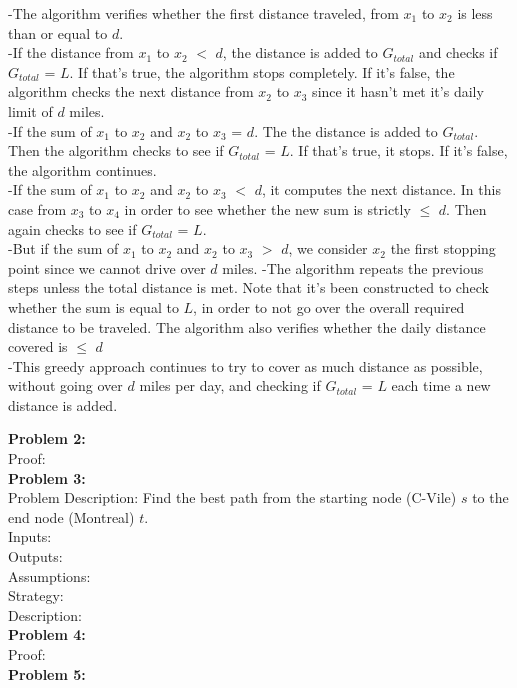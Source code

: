 \documentclass{article}
\begin{document}
\begin{addmargin}[1em]{2em}%
-The algorithm verifies whether the first distance traveled, from \(x_1\) to \(x_2\) is less than or equal to \(d\).\\
-If the distance from \(x_1\) to \(x_2\) $<$ \(d\), the distance is added to \(G_{total}\) and checks if \(G_{total}\) = \(L\). If that's true, the algorithm stops completely. If it's false, the algorithm checks the next distance from \(x_2\) to \(x_3\) since it hasn't met it's daily limit of \(d\) miles.\\
-If the sum of \(x_1\) to \(x_2\) and \(x_2\) to \(x_3\) = \(d\). The the distance is added to \(G_{total}\). Then the algorithm checks to see if \(G_{total}\) = \(L\). If that's true, it stops. If it's false, the algorithm continues.\\
-If the sum of \(x_1\) to \(x_2\) and \(x_2\) to \(x_3\) $<$ \(d\), it computes the next distance. In this case from \(x_3\) to \(x_4\) in order to see whether the new sum is strictly $\leq$ \(d\). Then again checks to see if \(G_{total}\) = \(L\). \\
-But if the sum of \(x_1\) to \(x_2\) and \(x_2\) to \(x_3\) $>$ \(d\), we consider \(x_2\) the first stopping point since we cannot drive over \(d\) miles.
-The algorithm repeats the previous steps unless the total distance is met. Note that it's been constructed to check whether the sum is equal to \(L\), in order to not go over the overall required distance to be traveled. The algorithm also verifies whether the daily distance covered is $\leq$ \(d\)\\
-This greedy approach continues to try to cover as much distance as possible, without going over \(d\) miles per day, and checking if \(G_{total}\) = \(L\) each time a new distance is added.\\
\end{addmargin}

\textbf{Problem 2:}\\
Proof:\\

\textbf{Problem 3:}\\
Problem Description: Find the best path from the starting node (C-Vile) \(s\) to the end node (Montreal) \(t\).\\
Inputs: \\ 
Outputs:\\
Assumptions: \\
Strategy: \\
Description:\\
\textbf{Problem 4:}\\
Proof:\\
\textbf{Problem 5:}\\
\end{document}
